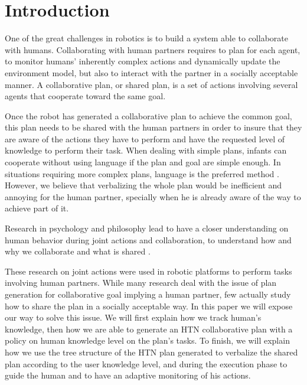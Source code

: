 \documentclass{llncs}
\begin{document}
\section{Introduction}
One of the great challenges in robotics is to build a system able to collaborate with humans. Collaborating with human partners requires to plan for each agent, to monitor humans' inherently complex actions and dynamically update the environment model, but also to interact with the partner in a socially acceptable manner.
A collaborative plan, or shared plan, is a set of actions involving several agents that cooperate toward the same goal.
%

Once the robot has generated a collaborative plan to achieve the common goal, this plan needs to be shared with the human partners in order to insure that they are aware of the actions they have to perform and have the requested level of knowledge to perform their task. When dealing with simple plans, infants can cooperate without using language if the plan and goal are simple enough. In situations requiring more complex plans, language is the preferred method \cite{Warneken2006,Warneken2007}. However, we believe that verbalizing the whole plan would be inefficient and 
annoying for the human partner, specially when he is already aware of the way to achieve part of it.  


Research in psychology and philosophy lead to have a closer understanding on human behavior during joint actions and collaboration, to understand how \cite{tomasello2005} and why \cite{tomasello2009} we collaborate and what is shared \cite{Butterfill2011}.

These research on joint actions were used in robotic platforms to perform tasks involving human partners. While many research deal with the issue of plan generation for collaborative goal implying a human partner,
 few actually study how to share the plan in a socially acceptable way.
In this paper we will expose our way to solve this issue. We will first explain how we track human's knowledge, then how we are able to generate an HTN collaborative plan with a policy on human knowledge level on the plan's tasks. To finish, we will explain how we use the tree structure of the HTN  plan generated to verbalize the shared plan according to the user knowledge level, and during the execution phase to guide the human and to have an adaptive monitoring of his actions. 
\end{document}
